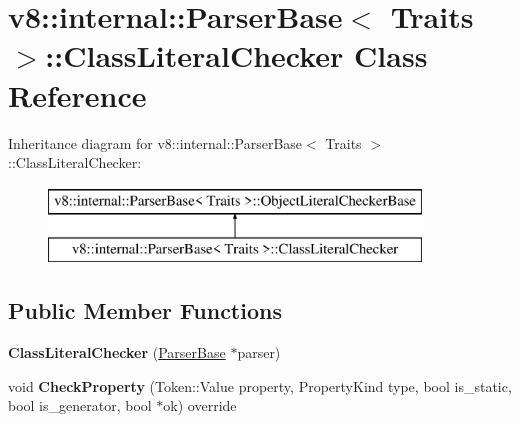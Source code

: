 \hypertarget{classv8_1_1internal_1_1_parser_base_1_1_class_literal_checker}{}\section{v8\+:\+:internal\+:\+:Parser\+Base$<$ Traits $>$\+:\+:Class\+Literal\+Checker Class Reference}
\label{classv8_1_1internal_1_1_parser_base_1_1_class_literal_checker}
Inheritance diagram for v8\+:\+:internal\+:\+:Parser\+Base$<$ Traits $>$\+:\+:Class\+Literal\+Checker\+:\begin{figure}[H]
\begin{center}
\leavevmode
\includegraphics[height=2.000000cm]{classv8_1_1internal_1_1_parser_base_1_1_class_literal_checker}
\end{center}
\end{figure}
\subsection*{Public Member Functions}
\begin{DoxyCompactItemize}
\item 
{\bfseries Class\+Literal\+Checker} (\hyperlink{classv8_1_1internal_1_1_parser_base}{Parser\+Base} $\ast$parser)\hypertarget{classv8_1_1internal_1_1_parser_base_1_1_class_literal_checker_a0147bbf266e0daa7397e5d61d4e7f013}{}\label{classv8_1_1internal_1_1_parser_base_1_1_class_literal_checker_a0147bbf266e0daa7397e5d61d4e7f013}

\item 
void {\bfseries Check\+Property} (Token\+::\+Value property, Property\+Kind type, bool is\+\_\+static, bool is\+\_\+generator, bool $\ast$ok) override\hypertarget{classv8_1_1internal_1_1_parser_base_1_1_class_literal_checker_addf97cbb87c5fca8bad9e84e33866a6a}{}\label{classv8_1_1internal_1_1_parser_base_1_1_class_literal_checker_addf97cbb87c5fca8bad9e84e33866a6a}

\end{DoxyCompactItemize}
